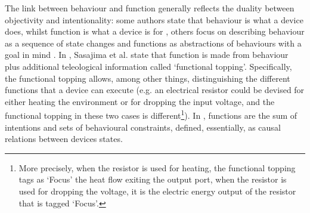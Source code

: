 \documentclass[sw]{iosart2x}
\newcommand{\quotes}[1]{`#1'}
\newcommand{\TODO}[1]{{%
}}
\newcommand{\TODOinline}[1]{{%
}}
\newcommand{\myComment}[1]{{\unskip \ignorespaces}}
\begin{document}
The link between behaviour and function generally reflects the duality between objectivity and intentionality: some authors state that behaviour is what a device does, whilst function is what a device is for \cite{kleer_qualitative_1984}, others focus on describing behaviour as a sequence of state changes and functions as abstractions of behaviours with a goal in mind \cite{umedaFunctionBehaviourStructure1990}.  
In \cite{sasajimaFBRLFunctionBehavior1995, sasajimaInvestigationDomainOntology1994}, Sasajima et al. state that function is made from behaviour plus additional teleological information called \quotes{functional topping}.
Specifically, the functional topping allows, among other things, distinguishing the different functions that a device can execute (e.g. an electrical resistor could be devised for either heating the environment or for dropping the input voltage, and the functional topping in these two cases is different\myComment{a heat exchanger could be devised for either heating or cooling depending on the context, and the functional topping in these two cases is different}\footnote{More precisely, when the resistor is used for heating, the functional topping tags as `Focus' the heat flow exiting the output port, when the resistor is used for dropping the voltage, it is the electric energy output of the resistor that is tagged `Focus'.}).
In \cite{chandrasekaranFunctionDeviceRepresentation2000}, functions are the sum of intentions and sets of behavioural constraints, defined, essentially, as causal relations between devices states.

\end{document}
